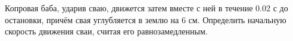 Копровая баба, ударив сваю, движется затем вместе с ней в течение
$0.02$ с до остановки, причём свая углубляется в землю на $6$ см.
Определить начальную скорость движения сваи, считая его
равнозамедленным.

